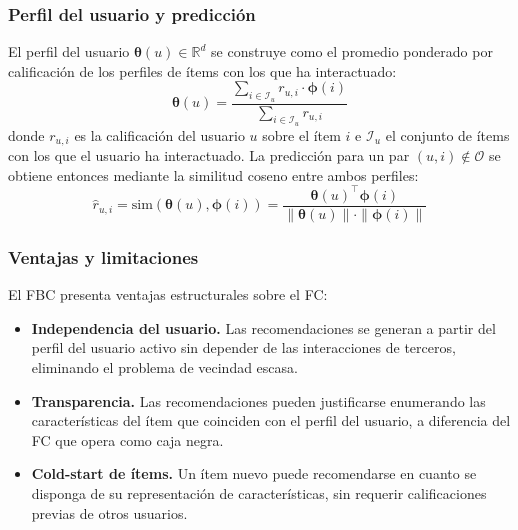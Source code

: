 \subsubsection*{Perfil del usuario y predicción}

El perfil del usuario $\boldsymbol{\theta}(u) \in \mathbb{R}^d$ se construye como el promedio ponderado por calificación de los perfiles de ítems con los que ha interactuado:
\begin{equation} \label{eq:user_profile_cbf}
	\boldsymbol{\theta}(u) = \frac{\displaystyle\sum_{i \in \mathcal{I}_u} r_{u,i} \cdot \boldsymbol{\phi}(i)}{\displaystyle\sum_{i \in \mathcal{I}_u} r_{u,i}}
\end{equation}
donde $r_{u,i}$ es la calificación del usuario $u$ sobre el ítem $i$ e $\mathcal{I}_u$ el conjunto de ítems con los que el usuario ha interactuado. La predicción para un par $(u, i) \notin \mathcal{O}$ se obtiene entonces mediante la similitud coseno entre ambos perfiles:
\begin{equation} \label{eq:cbf}
	\hat{r}_{u,i} = \mathrm{sim}\!\left(\boldsymbol{\theta}(u), \boldsymbol{\phi}(i)\right) = \frac{\boldsymbol{\theta}(u)^\top \boldsymbol{\phi}(i)}{\|\boldsymbol{\theta}(u)\| \cdot \|\boldsymbol{\phi}(i)\|}
\end{equation}

\subsubsection*{Ventajas y limitaciones}

El FBC presenta ventajas estructurales sobre el FC:
\begin{itemize}
	\item \textbf{Independencia del usuario.} Las recomendaciones se generan a partir del perfil del usuario activo sin depender de las interacciones de terceros, eliminando el problema de vecindad escasa.
	\item \textbf{Transparencia.} Las recomendaciones pueden justificarse enumerando las características del ítem que coinciden con el perfil del usuario, a diferencia del FC que opera como caja negra.
	\item \textbf{Cold-start de ítems.} Un ítem nuevo puede recomendarse en cuanto se disponga de su representación de características, sin requerir calificaciones previas de otros usuarios.
\end{itemize}

